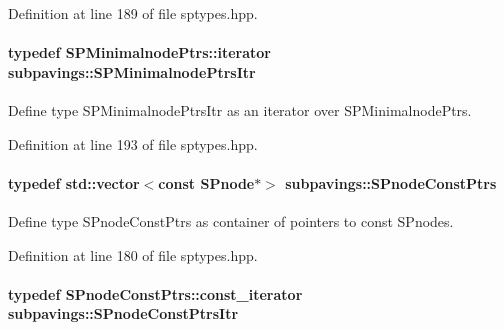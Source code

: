 \-Definition at line 189 of file sptypes.\-hpp.

\hypertarget{namespacesubpavings_a0799ad5c6a6d3cd3b7afef68e5dfce51}{
\paragraph[{\-S\-P\-Minimalnode\-Ptrs\-Itr}]{\setlength{\rightskip}{0pt plus 5cm}typedef \-S\-P\-Minimalnode\-Ptrs\-::iterator {\bf subpavings\-::\-S\-P\-Minimalnode\-Ptrs\-Itr}}}\label{namespacesubpavings_a0799ad5c6a6d3cd3b7afef68e5dfce51}


\-Define type \-S\-P\-Minimalnode\-Ptrs\-Itr as an iterator over \-S\-P\-Minimalnode\-Ptrs. 



\-Definition at line 193 of file sptypes.\-hpp.

\hypertarget{namespacesubpavings_a0c617b55345023a4c205603c167801b6}{
\paragraph[{\-S\-Pnode\-Const\-Ptrs}]{\setlength{\rightskip}{0pt plus 5cm}typedef std\-::vector$<$const {\bf \-S\-Pnode}$\ast$$>$ {\bf subpavings\-::\-S\-Pnode\-Const\-Ptrs}}}\label{namespacesubpavings_a0c617b55345023a4c205603c167801b6}


\-Define type \-S\-Pnode\-Const\-Ptrs as container of pointers to const \-S\-Pnodes. 



\-Definition at line 180 of file sptypes.\-hpp.

\hypertarget{namespacesubpavings_a4a185637f88fb7f6b082fca3a8d90537}{
\paragraph[{\-S\-Pnode\-Const\-Ptrs\-Itr}]{\setlength{\rightskip}{0pt plus 5cm}typedef \-S\-Pnode\-Const\-Ptrs\-::const\-\_\-iterator {\bf subpavings\-::\-S\-Pnode\-Const\-Ptrs\-Itr}}}\label{namespacesubpavings_a4a185637f88fb7f6b082fca3a8d90537}



